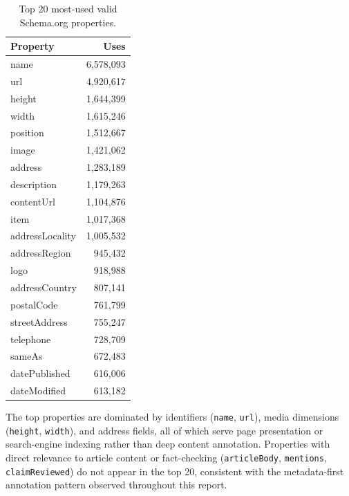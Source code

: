 \documentclass[11pt,a4paper]{article}
\begin{document}
\begin{table}[H]
\centering
\caption{Top 20 most-used valid Schema.org properties.}
\label{tab:top_valid_props}
\begin{tabular}{lr}
\toprule
\textbf{Property} & \textbf{Uses} \\
\midrule
name             & 6{,}578{,}093 \\
url              & 4{,}920{,}617 \\
height           & 1{,}644{,}399 \\
width            & 1{,}615{,}246 \\
position         & 1{,}512{,}667 \\
image            & 1{,}421{,}062 \\
address          & 1{,}283{,}189 \\
description      & 1{,}179{,}263 \\
contentUrl       & 1{,}104{,}876 \\
item             & 1{,}017{,}368 \\
addressLocality  & 1{,}005{,}532 \\
addressRegion    &   945{,}432   \\
logo             &   918{,}988   \\
addressCountry   &   807{,}141   \\
postalCode       &   761{,}799   \\
streetAddress    &   755{,}247   \\
telephone        &   728{,}709   \\
sameAs           &   672{,}483   \\
datePublished    &   616{,}006   \\
dateModified     &   613{,}182   \\
\bottomrule
\end{tabular}
\end{table}

The top properties are dominated by identifiers (\texttt{name}, \texttt{url}),
media dimensions (\texttt{height}, \texttt{width}), and address fields, all of
which serve page presentation or search-engine indexing rather than deep
content annotation.
Properties with direct relevance to article content or fact-checking
(\texttt{articleBody}, \texttt{mentions}, \texttt{claimReviewed}) do not
appear in the top 20, consistent with the metadata-first annotation pattern
observed throughout this report.
\end{document}
